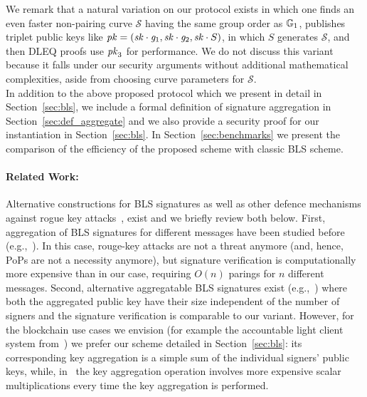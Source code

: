We remark that a natural variation on our protocol exists in which
one finds an even faster non-pairing curve $\mathcal{S}$ having the same
group order as $\mathbb{G}_{1}$,  publishes triplet public keys like
$\mathit{pk} = (\mathit{sk} \cdot \mathit{g}_{1}, \mathit{sk} \cdot \mathit{g}_{2}, \mathit{sk} \cdot S)$, in which $S$ generates
$\mathcal{S}$, and then DLEQ proofs use $\mathit{pk}_3$ for performance.
We do not discuss this variant because it falls under our security
arguments without additional mathematical complexities,
aside from choosing curve parameters for $\mathcal{S}$. \\

In addition to the above proposed protocol which we present in detail in Section~\ref{sec:bls}, 
we include a formal definition of signature aggregation in Section~\ref{sec:def_aggregate} and we also 
provide a security proof for our instantiation in Section~\ref{sec:bls}. In Section~\ref{sec:benchmarks} we present the comparison of the efficiency of the proposed scheme with classic BLS scheme. \\ 
 
\paragraph{Related Work:} Alternative constructions for BLS signatures as well as other defence mechanisms against 
rogue key attacks~\cite{proofs_of_posession}, exist and we briefly review both below. First, aggregation of BLS signatures for different messages have been studied before
(e.g.,~\cite{aggregate_BLS_signatures}). In this case, rouge-key attacks are not a threat anymore (and, hence, PoPs are not a necessity anymore), 
but signature verification is computationally more expensive than in our case, requiring $O(n)$ parings for $n$ different messages. Second, alternative aggregatable 
BLS signatures exist (e.g.,~\cite{boneh_compact_multisig}) where both the aggregated public key have their size independent 
of the number of signers and the signature verification is comparable to our variant. However, for the blockchain use cases we envision 
(for example the accountable light client system from~\cite{ourLC}) we prefer our scheme detailed in Section~\ref{sec:bls}: its corresponding key aggregation is a simple sum 
of the individual signers' public keys, while, in~\cite{boneh_compact_multisig} the key aggregation operation involves more expensive scalar 
multiplications every time the key aggregation is performed.
